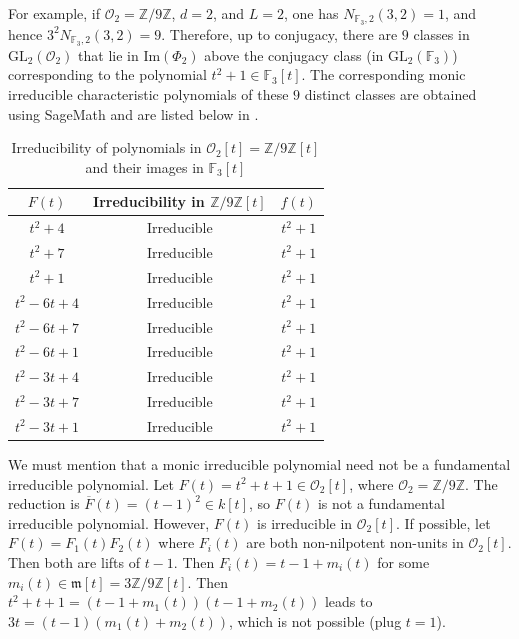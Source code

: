 \documentclass[11pt,twoside]{amsart}
\newcommand{\GL}{\mathrm{GL}}
\newcommand{\im}{\mathrm{Im}}
\newcommand{\Z}{\mathbb{Z}}
\newcommand{\R}{\mathscr{O}_2}
\theoremstyle{definition} %
\begin{document}
For example, if $\R= \mathbb{Z}/9\mathbb{Z}$, $d=2$, and $L=2$, one has $N_{\mathbb{F}_3,2}(3,2)=1$, and hence $3^2 N_{\mathbb{F}_3,2}(3,2)=9$. 
Therefore, up to conjugacy, there are $9$ classes in $\GL_2(\R)$ that lie in $\im(\Phi_2)$ above the conjugacy class (in $\GL_2(\mathbb{F}_3)$) corresponding to the polynomial $t^2+1\in \mathbb{F}_3[t]$.
The corresponding monic irreducible characteristic polynomials of these $9$ distinct classes are obtained using SageMath \cite{SageMath} and are listed below in .

\begin{table}[h!]
\centering
\begin{tabular}{|c|c|c|}
\hline
{$F(t)$} & {Irreducibility in $\mathbb{Z}/9\mathbb{Z}[t]$} & $f(t)$ \\
\hline
$t^2 + 4$         & Irreducible & $t^2 + 1$ \\
$t^2 + 7$         & Irreducible & $t^2 + 1$ \\
$t^2 + 1$         & Irreducible & $t^2 + 1$ \\
$t^2 - 6t + 4$    & Irreducible & $t^2 + 1$ \\
$t^2 - 6t + 7$    & Irreducible & $t^2 + 1$ \\
$t^2 - 6t + 1$    & Irreducible & $t^2 + 1$ \\
$t^2 - 3t + 4$    & Irreducible & $t^2 + 1$ \\
$t^2 - 3t + 7$    & Irreducible & $t^2 + 1$ \\
$t^2 - 3t + 1$    & Irreducible & $t^2 + 1$ \\
\hline
\end{tabular}
\caption{\centering Irreducibility of polynomials in $\R[t]=\mathbb{Z}/9\mathbb{Z}[t]$ and their images in $\mathbb{F}_3[t]$}
\label{tab:irred-F-f}
\end{table}



We must mention that a monic irreducible polynomial need not be a fundamental irreducible polynomial.
Let $F(t)=t^2+t+1\in \R[t]$, where $\R=\Z/9\Z$.
The reduction is $\overline{F}(t)=(t-1)^2\in k[t]$, so $F(t)$ is not a fundamental irreducible polynomial.
However, $F(t)$ is irreducible in $\R[t]$.
If possible, let $F(t)=F_1(t)F_2(t)$ where $F_i(t)$ are both non-nilpotent non-units in $\R[t]$.
Then both are lifts of $t-1$. 
Then $F_i(t)=t-1+m_i(t)$ for some $m_i(t)\in\mathfrak{m}[t]=3\Z/9\Z[t]$.
Then $t^2+t+1=(t-1+m_1(t))(t-1+m_2(t))$ leads to $3t=(t-1)(m_1(t)+m_2(t))$, which is not possible (plug $t=1$).
\end{document}
